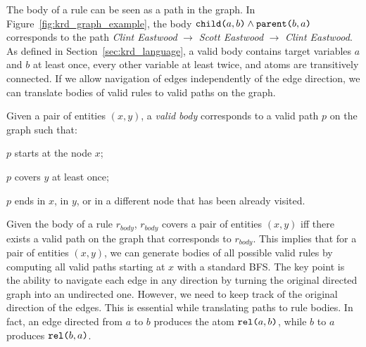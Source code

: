 The body of a rule can be seen as a path in the graph. In Figure~\ref{fig:krd_graph_example}, the body $\texttt{child(}a,b\texttt{)} \wedge \texttt{parent(}b,a\texttt{)}$ corresponds to the path \textit{Clint Eastwood} $\rightarrow$ \textit{Scott Eastwood} $\rightarrow$ \textit{Clint Eastwood}. 
As defined in Section~\ref{sec:krd_language}, a valid body contains target variables $a$ and $b$ at least once, every other variable at least twice, and atoms are transitively connected. 
If we allow navigation of edges independently of the edge direction, we can translate bodies of valid rules to valid paths on the graph.
\begin{inparaenum}[(i)]
	Given a pair of entities $(x,y)$, a {\em valid body} corresponds to a valid path $p$ on the graph such that:
	\item $p$ starts at the node $x$;
	\item $p$ covers $y$ at least once;
	\item $p$ ends in $x$, in $y$, or in a different node that has been already visited.
\end{inparaenum}
%
Given the body of a rule $r_{body}$, $r_{body}$ covers a pair of entities $(x,y)$ iff there exists a valid path on the graph that corresponds to $r_{body}$. This implies that for a pair of entities $(x,y)$, we can generate bodies of all possible valid rules by computing all valid paths starting at $x$ with a standard BFS. The key point is the ability to navigate each edge in any direction by turning the original directed graph into an undirected one.
However, we need to keep track of the original direction of the edges. This is essential while translating paths to rule bodies. In fact, %
an edge directed from $a$ to $b$ produces the atom $\texttt{rel(}a,b\texttt{)}$, while $b$ to $a$ produces $\texttt{rel(}b,a\texttt{)}$. 

